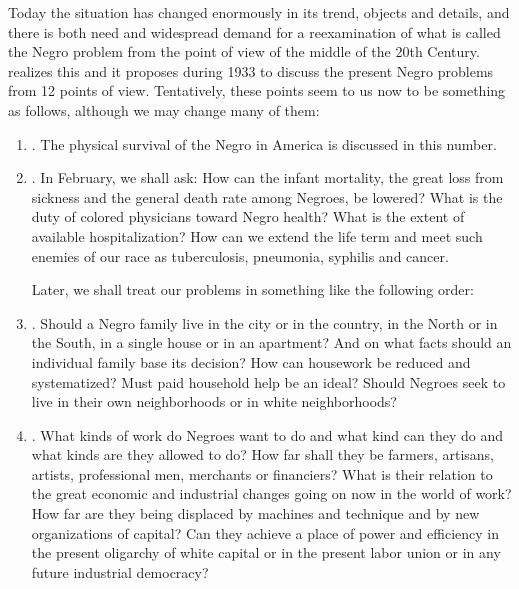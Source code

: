 \documentclass[letterpaper,10pt,english]{jupyterBook}
\begin{document}
\sphinxAtStartPar
Today the situation has changed enormously in its trend, objects and details, and there is both need and widespread demand for a re\sphinxhyphen{}examination of what is called the Negro problem from the point of view of the middle of the 20th Century.  realizes this and it proposes during 1933 to discuss the present Negro problems from 12 points of view. Tentatively, these points seem to us now to be something as follows, although we may change many of them:
\begin{enumerate}
%
\item {} 
\sphinxAtStartPar
{}. The physical survival of the Negro in America is discussed in this number.

\item {} 
\sphinxAtStartPar
{}. In February, we shall ask: How can the infant mortality, the great loss from sickness and the general death rate among Negroes, be lowered? What is the duty of colored physicians toward  Negro health? What is the extent of available hospitalization? How can we extend the life term and meet such enemies of our race as tuberculosis, pneumonia, syphilis and cancer.

Later, we shall treat our problems in something like the following order:


\item {} 
\sphinxAtStartPar
{}. Should a Negro family live in the city or in the country, in the North or in the South, in a single house or in an apartment? And on what facts should an individual family base its decision? How can housework be reduced and systematized? Must paid household help be an ideal? Should Negroes seek to live in their own neighborhoods or in white neighborhoods?

\item {} 
\sphinxAtStartPar
{}. What kinds of work do Negroes want to do and what kind can they do and what kinds are they allowed to do? How far shall they be farmers, artisans, artists, professional men, merchants or financiers? What is their relation to the great economic and industrial changes going on now in the world of work? How far are they being displaced by machines and technique and by new organizations of capital? Can they achieve a place of power and efficiency in the present oligarchy of white capital or in the present labor union or in any future industrial democracy?


\end{enumerate}
\end{document}
